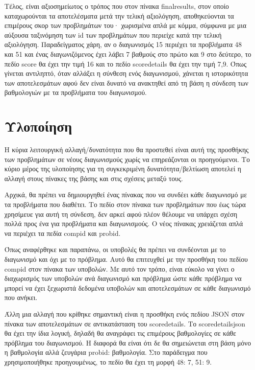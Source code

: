 \documentclass[diploma]{softlab-thesis}
\begin{document}
\bigskip

Τέλος, είναι αξιοσημείωτος ο τρόπος που στον πίνακα finalresults, στον
οποίο καταχωρούνται τα αποτελέσματα μετά την τελική αξιολόγηση, αποθηκεύονται
τα επιμέρους σκορ των προβλημάτων του· χωρισμένα απλά με κόμμα, σύμφωνα με μια
αύξουσα ταξινόμηση των id των προβλημάτων που περιείχε κατά την τελική αξιολόγηση.
Παραδείγματος χάρη, αν ο διαγωνισμός 15 περιέχει τα προβλήματα 48 και 51 και ένας
διαγωνιζόμενος έχει λάβει 7 βαθμούς στο πρώτο και 9 στο δεύτερο, το πεδίο score θα
έχει την τιμή 16 και το πεδίο scoredetails θα έχει την τιμή 7,9. Όπως γίνεται
αντιληπτό, όταν αλλάξει η σύνθεση ενός διαγωνισμού, χάνεται η ιστορικότητα των
αποτελεσμάτων αφού δεν είναι δυνατό να ανακτηθεί από τη βάση η σύνδεση των
βαθμολογιών με τα προβλήματα του διαγωνισμού.

\bigskip

\section{Υλοποίηση}

Η κύρια λειτουργική αλλαγή/δυνατότητα που θα προστεθεί είναι αυτή της προσθήκης
των προβλημάτων σε νέους διαγωνισμούς χωρίς να επηρεάζονται οι προηγούμενοι.
Το κύριο μέρος της υλοποίησης για τη συγκεκριμένη δυνατότητα/βελτίωση αποτελεί
η αλλαγή στους πίνακες της βάσης και στις σχέσεις μεταξύ τους.

\bigskip

Αρχικά, θα πρέπει να δημιουργηθεί ένας πίνακας που να συνδέει κάθε διαγωνισμό
με τα προβλήματα που διαθέτει. Το πεδίο στον πίνακα των προβλημάτων που έως
τώρα χρησίμευε για αυτή τη σύνδεση, δεν αρκεί αφού πλέον θέλουμε να υπάρχει
σχέση πολλά προς ένα για προβλήματα και διαγωνισμούς. Ο νέος πίνακας χρειάζεται
απλά να περιέχει τα πεδία compid και probid.

\bigskip

Όπως αναφέρθηκε και παραπάνω, οι υποβολές θα πρέπει να συνδέονται με το
διαγωνισμό και όχι με το πρόβλημα. Αυτό θα επιτευχθεί με την προσθήκη του
πεδίου compid στον πίνακα των υποβολών. Με αυτό τον τρόπο, είναι εύκολο να
γίνει ο διαχωρισμός των υποβολών ανά διαγωνισμό και πρόβλημα ώστε κάθε πρόβλημα
να μπορεί να έχει ξεχωριστά δεδομένα υποβολών και αποτελεσμάτων σε κάθε
διαγωνισμό που ανήκει.

\bigskip

Άλλη μια αλλαγή που κρίθηκε σημαντική είναι η προσθήκη ενός πεδίου JSON στον
πίνακα των αποτελεσμάτων σε αντικατάσταση του scoredetails. Το scoredetailsjson
θα έχει την ίδια λογική, δηλαδή θα αναγράφει τις επιμέρους βαθμολογίες σε κάθε
πρόβλημα του διαγωνισμού. Η διαφορά θα είναι ότι δε θα σημειώνεται στη βάση μόνο
η βαθμολογία αλλά ζευγάρια probid: βαθμολογία. Στο παράδειγμα που χρησιμοποιήθηκε
προηγουμένως, το πεδίο θα έχει τη μορφή {48: 7, 51: 9}.
\end{document}
